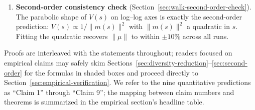 \begin{enumerate}
    three trained EasySteer vectors and two random-direction controls. The
    headline finding: the scaling law is a statement about \emph{aggregate
    steering magnitude}, not semantic direction; random vectors with matched
    aggregate magnitude reproduce trained-vector behaviour on Llama
    (slope $V = -1.85$ vs $-1.92$).
  \item \textbf{Second-order consistency check} (Section~\ref{sec:walk-second-order-check}).
    The parabolic shape of $V(s)$ on log--log axes is exactly the second-order
    prediction: $V(s) \propto 1/\|m(s)\|^2$ with $\|m(s)\|^2$ a quadratic in
    $s$. Fitting the quadratic recovers $\|\mu\|$ to within $\pm 10\%$ across
    all runs.
\end{enumerate}

\noindent
Proofs are interleaved with the statements throughout; readers focused on
empirical claims may safely skim Sections~\ref{sec:diversity-reduction}--\ref{sec:second-order}
for the formulas in shaded boxes and proceed directly to
Section~\ref{sec:empirical-verification}. We refer to the nine quantitative
predictions as ``Claim 1'' through ``Claim 9''; the mapping between claim
numbers and theorems is summarized in the empirical section's headline
table.












